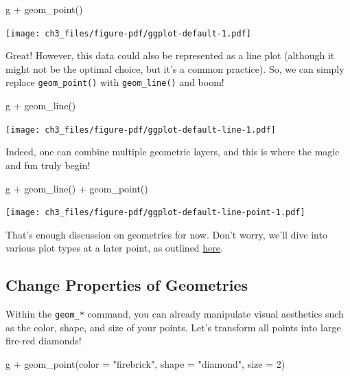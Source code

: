 \documentclass[
  letterpaper,
]{scrbook}
\newenvironment{Shaded}{\begin{snugshade}}{\end{snugshade}}
\newcommand{\AttributeTok}[1]{\textcolor[rgb]{0.40,0.45,0.13}{#1}}
\newcommand{\DecValTok}[1]{\textcolor[rgb]{0.68,0.00,0.00}{#1}}
\newcommand{\FunctionTok}[1]{\textcolor[rgb]{0.28,0.35,0.67}{#1}}
\newcommand{\NormalTok}[1]{\textcolor[rgb]{0.00,0.23,0.31}{#1}}
\newcommand{\SpecialCharTok}[1]{\textcolor[rgb]{0.37,0.37,0.37}{#1}}
\newcommand{\StringTok}[1]{\textcolor[rgb]{0.13,0.47,0.30}{#1}}
\begin{document}
\begin{Shaded}
\begin{Highlighting}[]
\NormalTok{g }\SpecialCharTok{+} \FunctionTok{geom\_point}\NormalTok{()}
\end{Highlighting}
\end{Shaded}

\texttt{[image: ch3\_files/figure-pdf/ggplot-default-1.pdf]}

Great! However, this data could also be represented as a line plot
(although it might not be the optimal choice, but it's a common
practice). So, we can simply replace \texttt{geom\_point()} with
\texttt{geom\_line()} and boom!

\begin{Shaded}
\begin{Highlighting}[]
\NormalTok{g }\SpecialCharTok{+} \FunctionTok{geom\_line}\NormalTok{()}
\end{Highlighting}
\end{Shaded}

\texttt{[image: ch3\_files/figure-pdf/ggplot-default-line-1.pdf]}

Indeed, one can combine multiple geometric layers, and this is where the
magic and fun truly begin!

\begin{Shaded}
\begin{Highlighting}[]
\NormalTok{g }\SpecialCharTok{+} \FunctionTok{geom\_line}\NormalTok{() }\SpecialCharTok{+} \FunctionTok{geom\_point}\NormalTok{()}
\end{Highlighting}
\end{Shaded}

\texttt{[image: ch3\_files/figure-pdf/ggplot-default-line-point-1.pdf]}

That's enough discussion on geometries for now. Don't worry, we'll dive
into various plot types at a later point, as outlined
\hyperref[charts]{here}.

\subsection{Change Properties of
Geometries}\label{change-properties-of-geometries}

Within the \texttt{geom\_*} command, you can already manipulate visual
aesthetics such as the color, shape, and size of your points. Let's
transform all points into large fire-red diamonds!

\begin{Shaded}
\begin{Highlighting}[]
\NormalTok{g }\SpecialCharTok{+} \FunctionTok{geom\_point}\NormalTok{(}\AttributeTok{color =} \StringTok{"firebrick"}\NormalTok{, }\AttributeTok{shape =} \StringTok{"diamond"}\NormalTok{, }\AttributeTok{size =} \DecValTok{2}\NormalTok{)}
\end{Highlighting}
\end{Shaded}
\end{document}
